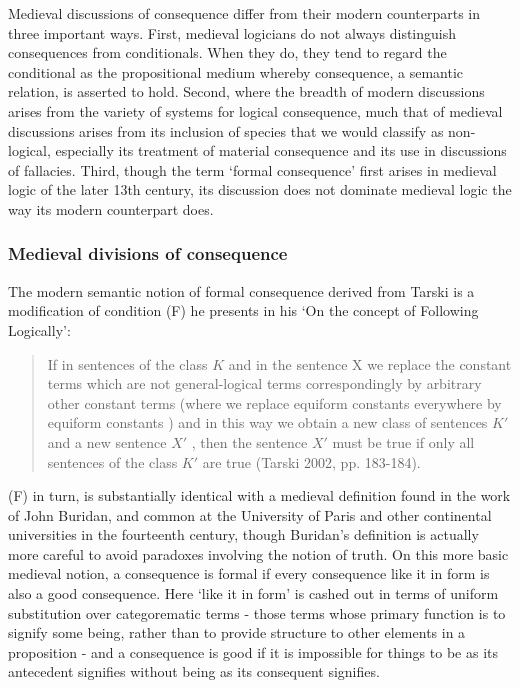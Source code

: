 \documentclass[a4paper,11pt]{article}
\begin{document}
Medieval discussions of consequence differ from their modern counterparts in three important ways. First, medieval logicians do not always distinguish consequences from conditionals. When they do, they tend to regard the conditional as the propositional medium whereby consequence, a semantic relation, is asserted to hold. Second, where the breadth of modern discussions arises from the variety of systems for logical consequence, much that of medieval discussions arises from its inclusion of species that we would classify as non-logical, especially its treatment of material consequence and its use in discussions of fallacies. Third, though the term `formal consequence' first arises in medieval logic of the later 13th century, its discussion does not dominate medieval logic the way its modern counterpart does. 

\subsubsection{Medieval divisions of consequence}
The modern semantic notion of formal consequence derived from Tarski is a modification of condition (F) he presents in his `On the concept of Following Logically':

\begin{quote}
  If in sentences of the class $K$ and in the sentence X we replace the constant terms which are not general-logical terms correspondingly by arbitrary other constant terms (where we replace equiform constants everywhere by equiform constants ) and in this way we obtain a new class of sentences $K'$ and a new sentence $X'$ , then the sentence $X'$ must be true if only all sentences of the class $K'$ are true (Tarski 2002, pp. 183-184).
\end{quote} 

(F) in turn, is substantially identical with a medieval definition found in the work of John Buridan, and common at the University of Paris and other continental universities in the fourteenth century, though Buridan's definition is actually more careful to avoid paradoxes involving the notion of truth. On this more basic medieval notion, a consequence is formal if every consequence like it in form is also a good consequence. Here `like it in form' is cashed out in terms of uniform substitution over categorematic terms - those terms whose primary function is to signify some being, rather than to provide structure to other elements in a proposition - and a consequence is good if it is impossible for things to be as its antecedent signifies without being as its consequent signifies. 
\end{document}
